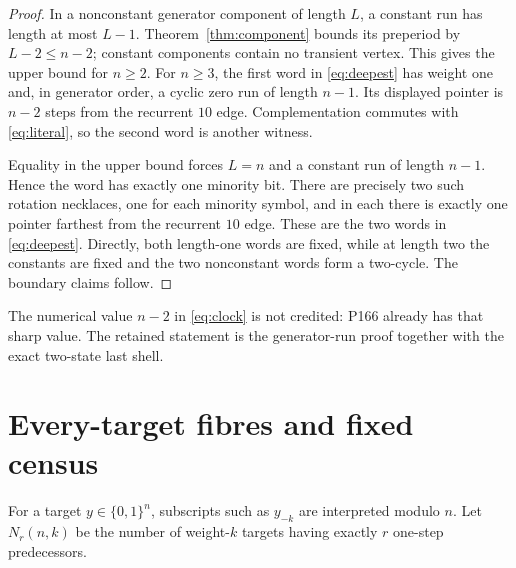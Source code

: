 \documentclass[a4paper,10pt]{amsart}
\theoremstyle{remark}
\newcommand{\F}{\{0,1\}}
\newcommand{\1}{\mathbf 1}
\begin{document}
\begin{proof}
In a nonconstant generator component of length $L$, a constant run has
length at most $L-1$.  Theorem~\ref{thm:component} bounds its preperiod by
$L-2\leq n-2$; constant components contain no transient vertex.  This gives
the upper bound for $n\geq2$.  For $n\geq3$, the first word in
\eqref{eq:deepest} has weight one and, in generator order, a cyclic zero run
of length $n-1$.  Its displayed pointer is $n-2$ steps from the recurrent
$10$ edge.  Complementation commutes with \eqref{eq:literal}, so the second
word is another witness.

Equality in the upper bound forces $L=n$ and a constant run of length
$n-1$.  Hence the word has exactly one minority bit.  There are precisely
two such rotation necklaces, one for each minority symbol, and in each
there is exactly one pointer farthest from the recurrent $10$ edge.  These
are the two words in \eqref{eq:deepest}.  Directly, both length-one words are
fixed, while at length two the constants are fixed and the two nonconstant
words form a two-cycle.  The boundary claims follow.
\end{proof}

The numerical value $n-2$ in \eqref{eq:clock} is not credited: P166 already
has that sharp value.  The retained statement is the generator-run proof
together with the exact two-state last shell.

\section{Every-target fibres and fixed census}

For a target $y\in\F^n$, subscripts such as $y_{-k}$ are interpreted modulo
$n$.  Let $N_r(n,k)$ be the number of weight-$k$ targets having exactly
$r$ one-step predecessors.
\end{document}

